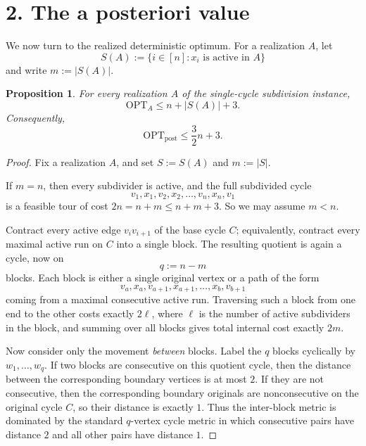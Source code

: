 \documentclass[11pt]{amsart}
\newtheorem{proposition}[theorem]{Proposition}
\newcommand{\optpost}{\mathrm{OPT}_{\mathrm{post}}}
\begin{document}
\section*{2. The a posteriori value}

We now turn to the realized deterministic optimum. For a realization $A$, let
\[
S(A):=\{i\in[n]: x_i\text{ is active in }A\}
\]
and write $m:=|S(A)|$.

\begin{proposition}\label{prop:post}
For every realization $A$ of the single-cycle subdivision instance,
\[
\mathrm{OPT}_A\le n+|S(A)|+3.
\]
Consequently,
\[
\optpost\le \frac32 n+3.
\]
\end{proposition}

\begin{proof}
Fix a realization $A$, and set $S:=S(A)$ and $m:=|S|$.

If $m=n$, then every subdivider is active, and the full subdivided cycle
\[
v_1,x_1,v_2,x_2,\dots,v_n,x_n,v_1
\]
is a feasible tour of cost $2n=n+m\le n+m+3$. So we may assume $m<n$.

Contract every active edge $v_iv_{i+1}$ of the base cycle $C$; equivalently, contract every maximal active run on $C$ into a single block. The resulting quotient is again a cycle, now on
\[
q:=n-m
\]
blocks. Each block is either a single original vertex or a path of the form
\[
v_a,x_a,v_{a+1},x_{a+1},\dots,x_b,v_{b+1}
\]
coming from a maximal consecutive active run. Traversing such a block from one end to the other costs exactly $2\ell$, where $\ell$ is the number of active subdividers in the block, and summing over all blocks gives total internal cost exactly $2m$.

Now consider only the movement \emph{between} blocks. Label the $q$ blocks cyclically by $w_1,\dots,w_q$. If two blocks are consecutive on this quotient cycle, then the distance between the corresponding boundary vertices is at most $2$. If they are not consecutive, then the corresponding boundary originals are nonconsecutive on the original cycle $C$, so their distance is exactly $1$. Thus the inter-block metric is dominated by the standard $q$-vertex cycle metric in which consecutive pairs have distance $2$ and all other pairs have distance $1$.


\end{proof}
\end{document}
